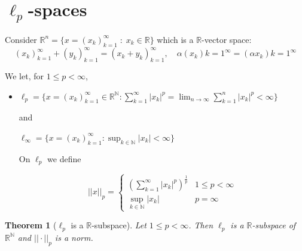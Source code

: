 \documentclass[11pt, oneside]{book}
\theoremstyle{break}
\newtheorem{thm}{Theorem}[section]
\newcommand{\bb}[1]{\mathbb{#1}}			%
\begin{document}
\section{\texorpdfstring{$\ell_p$}{lp}-spaces}\label{sect:lp spaces}

Consider $\bb{R}^n = \{x = (x_k)_{k=1}^\infty \; : \; x_k \in \bb{R}\}$ which is a $\bb{R}$-vector space:
\begin{equation}
	(x_k)_{k=1}^\infty + (y_k)_{k=1}^\infty = (x_k + y_k)_{k = 1}^\infty, \quad \alpha(x_k){k=1}^\infty = (\alpha x_k){k=1}^\infty
\end{equation}

We let, for $1 \leq p < \infty$,
\begin{itemize}
	\item $\ell_p = \{x = (x_k)_{k=1}^\infty \in \bb{R}^\bb{N} : \sum_{k=1}^{\infty} |x_k|^p = \lim_{n \to \infty} \sum_{k=1}^{n} |x_k|^p < \infty \}$
		
		and

		$\ell_\infty = \{x = (x_k)_{k=1}^\infty : \sup_{k \in \bb{N}} |x_k| < \infty \}$

		On $\ell_p$ we define

		\begin{equation}
			||x||_p =
			\begin{cases}
				\left( \sum_{k=1}^{\infty} |x_k|^p \right)^{\frac{1}{p}}	&	1 \leq p < \infty \\
				\sup_{k \in \bb{N}} |x_k|		&		p = \infty
			\end{cases}
		\end{equation}
\end{itemize}

\begin{thm}[$\ell_p$ is a $\bb{R}$-subspace]
	Let $1 \leq p < \infty$. Then $\ell_p$ is a $\bb{R}$-subspace of $\bb{R}^\bb{N}$ and $||\cdot||_p$ is a norm.
\end{thm}
\end{document}
